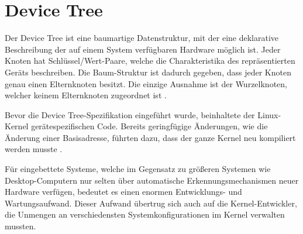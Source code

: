 \section{Device Tree}

Der Device Tree ist eine baumartige Datenstruktur, mit der eine deklarative Beschreibung der auf einem System verfügbaren Hardware  möglich ist. Jeder Knoten hat Schlüssel/Wert-Paare, welche die Charakteristika des repräsentierten Geräts beschreiben. Die Baum-Struktur ist dadurch gegeben, dass jeder Knoten genau einen Elternknoten besitzt. Die einzige Ausnahme ist der Wurzelknoten, welcher keinem Elternknoten zugeordnet ist \cite[6]{manual:devicetree_specification}. 

Bevor die Device Tree-Spezifikation eingeführt wurde, beinhaltete der Linux-Kernel gerätespezifischen Code. Bereits geringfügige Änderungen, wie die Änderung einer Basisadresse, führten dazu, dass der ganze Kernel neu kompiliert werden musste \cite[1]{manual:intro_to_devicetrees}. 

Für eingebettete Systeme, welche im Gegensatz zu größeren Systemen wie Desktop-Computern nur selten über automatische Erkennungsmechanismen neuer Hardware verfügen, bedeutet es einen enormen Entwicklungs- und Wartungsaufwand. Dieser Aufwand übertrug sich auch auf die Kernel-Entwickler, die Unmengen an verschiedensten Systemkonfigurationen im Kernel verwalten mussten.  

